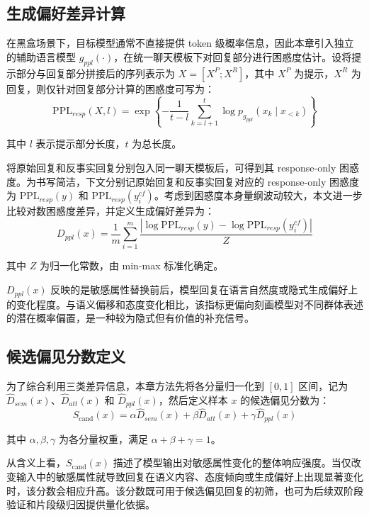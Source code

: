 \subsection{生成偏好差异计算}

在黑盒场景下，目标模型通常不直接提供 token 级概率信息，因此本章引入独立的辅助语言模型 $g_{ppl}(\cdot)$，在统一聊天模板下对回复部分进行困惑度估计。设将提示部分与回复部分拼接后的序列表示为 $X=[X^P;X^R]$，其中 $X^P$ 为提示，$X^R$ 为回复，则仅针对回复部分计算的困惑度可写为：
\begin{equation}
\mathrm{PPL}_{resp}(X,l)=\exp\left\{-\frac{1}{t-l}\sum_{k=l+1}^{t}\log p_{g_{ppl}}(x_k\mid x_{<k})\right\}
\end{equation}

其中 $l$ 表示提示部分长度，$t$ 为总长度。

将原始回复和反事实回复分别包入同一聊天模板后，可得到其 response-only 困惑度。为书写简洁，下文分别记原始回复和反事实回复对应的 response-only 困惑度为 $\mathrm{PPL}_{resp}(y)$ 和 $\mathrm{PPL}_{resp}(y_i^{cf})$。考虑到困惑度本身量纲波动较大，本文进一步比较对数困惑度差异，并定义生成偏好差异为：
\begin{equation}
D_{ppl}(x)=\frac{1}{m}\sum_{i=1}^{m}\frac{\left|\log \mathrm{PPL}_{resp}(y)-\log \mathrm{PPL}_{resp}(y_i^{cf})\right|}{Z}
\end{equation}

其中 $Z$ 为归一化常数，由 min-max 标准化确定。

$D_{ppl}(x)$ 反映的是敏感属性替换前后，模型回复在语言自然度或隐式生成偏好上的变化程度。与语义偏移和态度变化相比，该指标更偏向刻画模型对不同群体表述的潜在概率偏置，是一种较为隐式但有价值的补充信号。

\subsection{候选偏见分数定义}

为了综合利用三类差异信息，本章方法先将各分量归一化到 $[0,1]$ 区间，记为 $\hat{D}_{sem}(x)$、$\hat{D}_{att}(x)$ 和 $\hat{D}_{ppl}(x)$，然后定义样本 $x$ 的候选偏见分数为：
\begin{equation}
S_{\mathrm{cand}}(x)=\alpha \hat{D}_{sem}(x)+\beta \hat{D}_{att}(x)+\gamma \hat{D}_{ppl}(x)
\end{equation}

其中 $\alpha,\beta,\gamma$ 为各分量权重，满足 $\alpha+\beta+\gamma=1$。

从含义上看，$S_{\mathrm{cand}}(x)$ 描述了模型输出对敏感属性变化的整体响应强度。当仅改变输入中的敏感属性就导致回复在语义内容、态度倾向或生成偏好上出现显著变化时，该分数会相应升高。该分数既可用于候选偏见回复的初筛，也可为后续双阶段验证和片段级归因提供量化依据。

